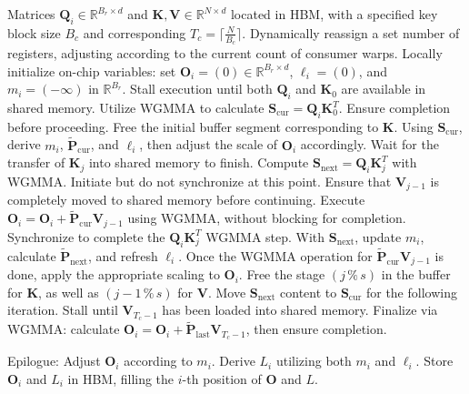 \begin{algorithm}[H]
    \caption{\small\label{alg:flash3_wgmma}\textsc{FlashAttention-3} consumer warpgroup forward pass}
    \begin{algorithmic}[1]
      \REQUIRE  Matrices $\mathbf{Q}_i \in \mathbb{R}^{B_r \times d}$ and $\mathbf{K}, \mathbf{V} \in \mathbb{R}^{N \times d}$ located in HBM, with a specified key block size $B_c$ and corresponding $T_c = \lceil \frac{N}{B_c} \rceil$.
      \STATE Dynamically reassign a set number of registers, adjusting according to the current count of consumer warps.
      \STATE Locally initialize on-chip variables: set $\mathbf{O}_i = (0) \in \mathbb{R}^{B_r \times d}$, $\ell_i = (0)$, and $m_i = (-\infty)$ in $\mathbb{R}^{B_r}$.
      \STATE Stall execution until both $\mathbf{Q}_i$ and $\mathbf{K}_0$ are available in shared memory.
      \STATE Utilize WGMMA to calculate $\mathbf{S}_{\mathrm{cur}} = \mathbf{Q}_i \mathbf{K}_0^T$. Ensure completion before proceeding.
      \STATE Free the initial buffer segment corresponding to $\mathbf{K}$.
      \STATE Using $\mathbf{S}_{\mathrm{cur}}$, derive $m_{i}$, $\tilde{\mathbf{P}}_{\mathrm{cur}}$, and $\ell_{i}$, then adjust the scale of $\mathbf{O}_i$ accordingly.
        \STATE Wait for the transfer of $\mathbf{K}_j$ into shared memory to finish.
        \label{code:mainloop_start}
        \STATE Compute $\mathbf{S}_{\mathrm{next}} = \mathbf{Q}_i \mathbf{K}_{j}^T$ with WGMMA. Initiate but do not synchronize at this point. \label{code:first_wgmma}
        \STATE Ensure that $\mathbf{V}_{j-1}$ is completely moved to shared memory before continuing.
        \STATE Execute $\mathbf{O}_{i} = \mathbf{O}_{i} + \tilde{\mathbf{P}}_{\mathrm{cur}} \mathbf{V}_{j-1}$ using WGMMA, without blocking for completion. \label{code:second_wgmma}
        \STATE Synchronize to complete the $\mathbf{Q}_i \mathbf{K}_{j}^T$ WGMMA step.
        \STATE With $\mathbf{S}_{\mathrm{next}}$, update $m_{i}$, calculate $\tilde{\mathbf{P}}_{\mathrm{next}}$, and refresh $\ell_{i}$. \label{code:softmax}
        \STATE Once the WGMMA operation for $\tilde{\mathbf{P}}_{\mathrm{cur}} \mathbf{V}_{j-1}$ is done, apply the appropriate scaling to $\mathbf{O}_i$.
        \STATE Free the stage $(j\,\%\,s)$ in the buffer for $\mathbf{K}$, as well as $(j-1\,\%\,s)$ for $\mathbf{V}$.
        \STATE Move $\mathbf{S}_{\mathrm{next}}$ content to $\mathbf{S}_{\mathrm{cur}}$ for the following iteration.
        \label{code:mainloop_end}
      \ENDFOR \STATE Stall until $\mathbf{V}_{T_c - 1}$ has been loaded into shared memory.
      \STATE Finalize via WGMMA: calculate $\mathbf{O}_{i} = \mathbf{O}_{i} + \tilde{\mathbf{P}}_{\mathrm{last}} \mathbf{V}_{T_c - 1}$, then ensure completion.

\STATE Epilogue: Adjust $\mathbf{O}_{i}$ according to $m_{i}$. Derive $L_{i}$ utilizing both $m_{i}$ and $\ell_{i}$. Store $\mathbf{O}_{i}$ and $L_{i}$ in HBM, filling the $i$-th position of $\mathbf{O}$ and $L$.

\end{algorithmic}
\end{algorithm}

